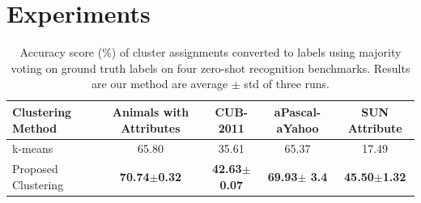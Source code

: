 \documentclass[letterpaper]{article}
\begin{document}
\section{Experiments} \label{experiments}
\begin{table}[ht]
\begin{minipage}{\textwidth}
\centering
\caption{Accuracy score (\%) of cluster assignments converted to labels
using majority voting on ground truth labels on four zero-shot recognition benchmarks.
Results are our method are average $\pm$ std of three runs.
} \vspace{2mm} \label{tab:cluster}
\begin{tabular}{|l|c|c|c|c|}
\hline
Clustering Method & Animals with Attributes & CUB-2011 & aPascal-aYahoo & SUN Attribute \\
\hline
k-means                             &  65.80                 & 35.61           & 65.37                & 17.49    \\
\hline
Proposed Clustering                     & \textbf{70.74$\pm$0.32}  & \textbf{42.63$\pm$0.07} & \textbf{69.93$\pm$ 3.4} & \textbf{ 45.50$\pm$1.32} \\
\hline
\end{tabular}
\end{minipage}
\end{table}
\end{document}
